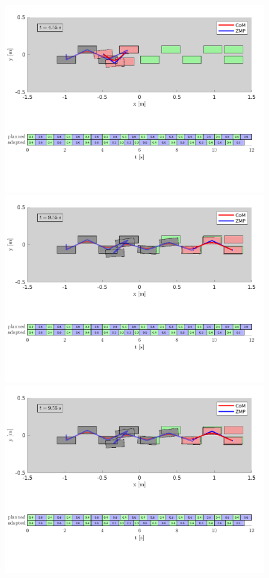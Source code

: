 \begin{figure}
    \centering
    \includegraphics[trim={0 5.9cm 0 0.7cm},clip,width=\textwidth]{figures/empty-fixed-plot-after-push.pdf}
    \includegraphics[trim={0 5.9cm 0 0.7cm},clip,width=\textwidth]{figures/empty-fixed-plot-completing-task.pdf}
    \includegraphics[trim={0 2.2cm 0 8.6cm},clip,width=\textwidth]{figures/empty-fixed-plot-completing-task.pdf}

\end{figure}
